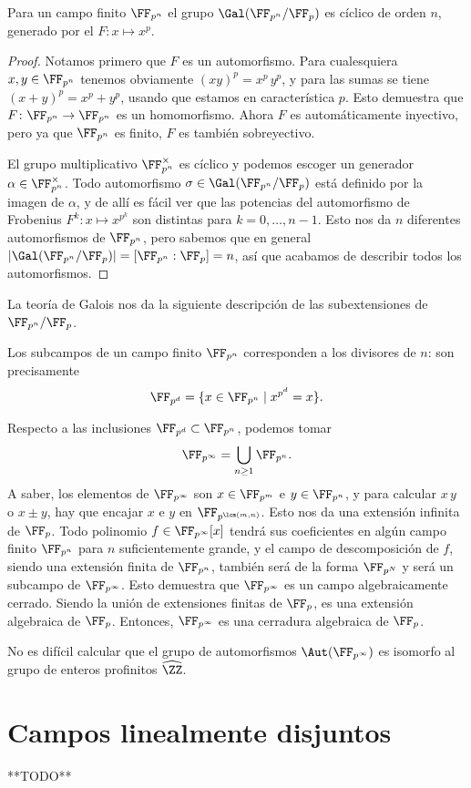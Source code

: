 \begin{teorema}
  Para un campo finito $\FF_{p^n}$ el grupo $\Gal (\FF_{p^n}/\FF_p)$ es cíclico
  de orden $n$, generado por el 
  $F\colon x \mapsto x^p$.

  \begin{proof}
    Notamos primero que $F$ es un automorfismo. Para cualesquiera
    $x,y\in \FF_{p^n}$ tenemos obviamente $(xy)^p = x^p\,y^p$, y para las sumas
    se tiene $(x + y)^p = x^p + y^p$, usando que estamos en característica $p$.
    Esto demuestra que $F\colon \FF_{p^n} \to \FF_{p^n}$ es un homomorfismo.
    Ahora $F$ es automáticamente inyectivo, pero ya que $\FF_{p^n}$ es finito,
    $F$ es también sobreyectivo.

    El grupo multiplicativo $\FF_{p^n}^\times$ es cíclico y podemos escoger un
    generador $\alpha \in \FF_{p^n}^\times$. Todo automorfismo
    $\sigma \in \Gal (\FF_{p^n}/\FF_p)$ está definido por la imagen de $\alpha$,
    y de allí es fácil ver que las potencias del automorfismo de Frobenius
    $F^k\colon x\mapsto x^{p^k}$ son distintas para $k = 0, \ldots, n-1$.
    Esto nos da $n$ diferentes automorfismos de $\FF_{p^n}$, pero sabemos que
    en general $|\Gal (\FF_{p^n}/\FF_p)| = [\FF_{p^n} : \FF_p] = n$, así que
    acabamos de describir todos los automorfismos.
  \end{proof}
\end{teorema}

La teoría de Galois nos da la siguiente descripción de las subextensiones
de $\FF_{p^n}/\FF_p$.

\begin{corolario}
  Los subcampos de un campo finito $\FF_{p^n}$ corresponden a los divisores de
  $n$: son precisamente
  $$\FF_{p^d} = \{ x\in \FF_{p^n} \mid x^{p^d} = x \}.$$
\end{corolario}

\begin{comentario}
  Respecto a las inclusiones $\FF_{p^d} \subset \FF_{p^n}$, podemos tomar
  $$\FF_{p^\infty} = \bigcup_{n\ge 1} \FF_{p^n}.$$
  A saber, los elementos de $\FF_{p^\infty}$ son $x\in \FF_{p^m}$ e
  $y \in \FF_{p^n}$, y para calcular $x\,y$ o $x\pm y$, hay que encajar $x$ e $y$
  en $\FF_{p^{\lcm (m,n)}}$. Esto nos da una extensión infinita de $\FF_p$.
  Todo polinomio $f \in \FF_{p^\infty} [x]$ tendrá sus coeficientes en algún campo
  finito $\FF_{p^n}$ para $n$ suficientemente grande, y el campo de descomposición
  de $f$, siendo una extensión finita de $\FF_{p^n}$, también será de la forma
  $\FF_{p^N}$ y será un subcampo de $\FF_{p^\infty}$. Esto demuestra que
  $\FF_{p^\infty}$ es un campo algebraicamente cerrado. Siendo la unión de
  extensiones finitas de $\FF_p$, es una extensión algebraica de
  $\FF_p$. Entonces, $\FF_{p^\infty}$ es una cerradura algebraica de $\FF_p$.

  No es difícil calcular que el grupo de automorfismos $\Aut (\FF_{p^\infty})$
  es isomorfo al grupo de enteros profinitos $\widehat{\ZZ}$.
\end{comentario}


\section{Campos linealmente disjuntos}

**TODO**
